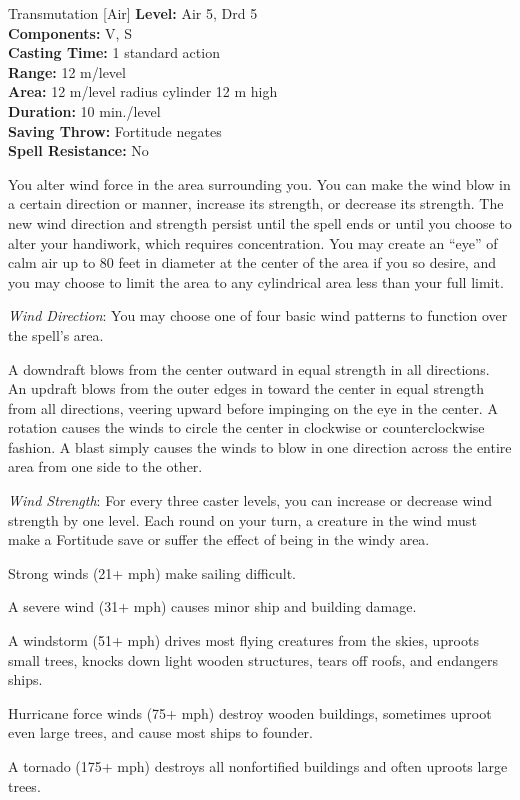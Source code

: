 {Transmutation [Air]}
{
	\textbf{Level:}
	Air 5, Drd 5\\
	\textbf{Components:}
	V, S\\
	\textbf{Casting Time:}
	1 standard action\\
	\textbf{Range:}
	12 m/level\\
	\textbf{Area:}
	12 m/level radius cylinder 12 m high\\
	\textbf{Duration:}
	10 min./level\\
	\textbf{Saving Throw:}
	Fortitude negates\\
	\textbf{Spell Resistance:}
	No\\
}
{
	You alter wind force in the area surrounding you. You can make the wind blow in a certain direction or manner, increase its strength, or decrease its strength. The new wind direction and strength persist until the spell ends or until you choose to alter your handiwork, which requires concentration. You may create an ``eye'' of calm air up to 80 feet in diameter at the center of the area if you so desire, and you may choose to limit the area to any cylindrical area less than your full limit.

	\textit{Wind Direction}:
	You may choose one of four basic wind patterns to function over the spell's area.


A downdraft blows from the center outward in equal strength in all directions.
An updraft blows from the outer edges in toward the center in equal strength from all directions, veering upward before impinging on the eye in the center.
A rotation causes the winds to circle the center in clockwise or counterclockwise fashion.
A blast simply causes the winds to blow in one direction across the entire area from one side to the other.

	\textit{Wind Strength}:
	For every three caster levels, you can increase or decrease wind strength by one level. Each round on your turn, a creature in the wind must make a Fortitude save or suffer the effect of being in the windy area.

	Strong winds (21+ mph) make sailing difficult.

	A severe wind (31+ mph) causes minor ship and building damage.

	A windstorm (51+ mph) drives most flying creatures from the skies, uproots small trees, knocks down light wooden structures, tears off roofs, and endangers ships.

	Hurricane force winds (75+ mph) destroy wooden buildings, sometimes uproot even large trees, and cause most ships to founder.

	A tornado (175+ mph) destroys all nonfortified buildings and often uproots large trees.

}
